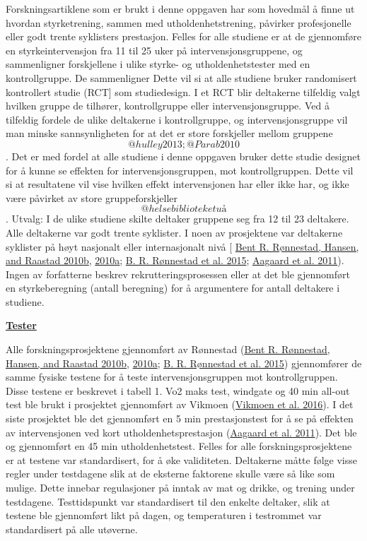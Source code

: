 \documentclass[
]{book}
\begin{document}
Forskningsartiklene som er brukt i denne oppgaven har som hovedmål å
finne ut hvordan styrketrening, sammen med utholdenhetstrening, påvirker
profesjonelle eller godt trente syklisters prestasjon. Felles for alle
studiene er at de gjennomføre en styrkeintervensjon fra 11 til 25 uker
på intervensjonsgruppene, og sammenligner forskjellene i ulike styrke-
og utholdenhetstester med en kontrollgruppe. De sammenligner Dette vil
si at alle studiene bruker randomisert kontrollert studie (RCT{]} som
studiedesign. I et RCT blir deltakerne tilfeldig valgt hvilken gruppe de
tilhører, kontrollgruppe eller intervensjonsgruppe. Ved å tilfeldig
fordele de ulike deltakerne i kontrollgruppe, og intervensjonsgruppe vil
man minske sannsynligheten for at det er store forskjeller mellom
gruppene \[@hulley2013; @Parab2010\]. Det er med fordel at alle studiene
i denne oppgaven bruker dette studie designet for å kunne se effekten
for intervensjonsgruppen, mot kontrollgruppen. Dette vil si at
resultatene vil vise hvilken effekt intervensjonen har eller ikke har,
og ikke være påvirket av store gruppeforskjeller \[@helsebiblioteketuå\]
. Utvalg: I de ulike studiene skilte deltaker gruppene seg fra 12 til 23
deltakere. Alle deltakerne var godt trente syklister. I noen av
prosjektene var deltakerne syklister på høyt nasjonalt eller
internasjonalt nivå {[} \protect\hyperlink{ref-ruxf8nnestad2010a}{Bent
R. Rønnestad, Hansen, and Raastad 2010b},
\protect\hyperlink{ref-ruxf8nnestad2010b}{2010a};
\protect\hyperlink{ref-ruxf8nnestad2015}{B. R. Rønnestad et al. 2015};
\protect\hyperlink{ref-aagaard2011}{Aagaard et al. 2011}). Ingen av
forfatterne beskrev rekrutteringsprosessen eller at det ble gjennomført
en styrkeberegning (antall beregning) for å argumentere for antall
deltakere i studiene.

\underline{\textbf{Tester}}

Alle forskningsprosjektene gjennomført av Rønnestad
(\protect\hyperlink{ref-ruxf8nnestad2010a}{Bent R. Rønnestad, Hansen,
and Raastad 2010b}, \protect\hyperlink{ref-ruxf8nnestad2010b}{2010a};
\protect\hyperlink{ref-ruxf8nnestad2015}{B. R. Rønnestad et al. 2015})
gjennomfører de samme fysiske testene for å teste intervensjonsgruppen
mot kontrollgruppen. Disse testene er beskrevet i tabell 1. Vo2 maks
test, windgate og 40 min all-out test ble brukt i prosjektet gjennomført
av Vikmoen (\protect\hyperlink{ref-vikmoen2016}{Vikmoen et al. 2016}). I
det siste prosjektet ble det gjennomført en 5 min prestasjonstest for å
se på effekten av intervensjonen ved kort utholdenhetsprestasjon
(\protect\hyperlink{ref-aagaard2011}{Aagaard et al. 2011}). Det ble og
gjennomført en 45 min utholdenhetstest. Felles for alle
forskningsprosjektene er at testene var standardisert, for å øke
validiteten. Deltakerne måtte følge visse regler under testdagene slik
at de eksterne faktorene skulle være så like som mulige. Dette innebar
regulasjoner på inntak av mat og drikke, og trening under testdagene.
Testtidspunkt var standardisert til den enkelte deltaker, slik at
testene ble gjennomført likt på dagen, og temperaturen i testrommet var
standardisert på alle utøverne.
\end{document}
